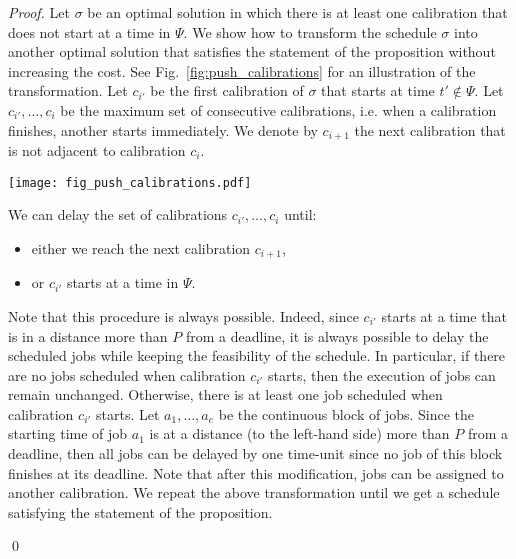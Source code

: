 \begin{proof}
Let $\sigma$ be an optimal solution in which there is at least one calibration that does not start at a time in $\Psi$.
We show how to transform the schedule $\sigma$ into another optimal
solution that satisfies the statement of the proposition without increasing the cost.
See Fig.~\ref{fig:push_calibrations} for an illustration of the transformation.
Let $c_{i'}$ be the first calibration of $\sigma$  that starts at
time $t' \notin \Psi$.
Let $c_{i'},\ldots, c_i$ be the maximum set of consecutive calibrations, i.e.
when a calibration finishes, another starts immediately.
We denote by $c_{i+1}$ the next calibration that is not adjacent to calibration $c_i$.
\begin{figure*}[ht]
\centering
\texttt{[image: fig\_push\_calibrations.pdf]}
\caption{Illustration of Proposition~\ref{prop:position_calibration}. The first schedule is an optimal schedule. The second one is obtained after delaying the continuous 
block of calibrations $c_{i'},\ldots, c_i$.}
\label{fig:push_calibrations}
\end{figure*}
We can delay the set of calibrations $c_{i'},\ldots, c_i$ until:
\begin{itemize}
\item either we reach the next calibration $c_{i+1}$,
\item or $c_{i'}$ starts at a time in $\Psi$.
\end{itemize}
Note that this procedure is always possible.
Indeed, since $c_{i'}$ starts at a time that is in a distance more than $P$ from a deadline, it is always possible to delay the scheduled jobs while keeping the feasibility of the schedule. 
In particular, if there are no jobs scheduled when calibration $c_{i'}$ starts, then the execution of jobs can remain unchanged.
Otherwise, there is at least one job scheduled when 
calibration $c_{i'}$ starts. Let  $a_1,\ldots,a_e$ be the continuous block of jobs.
Since the starting time of job $a_1$ is at a distance  (to the left-hand side) more than 
$P$ from a deadline, then all  jobs
can be delayed by one time-unit since no job of this block finishes at its deadline.
Note that after this modification, jobs can be assigned to another calibration.
We repeat the above transformation until we get a schedule satisfying the
statement of the proposition.

\qed\end{proof}






